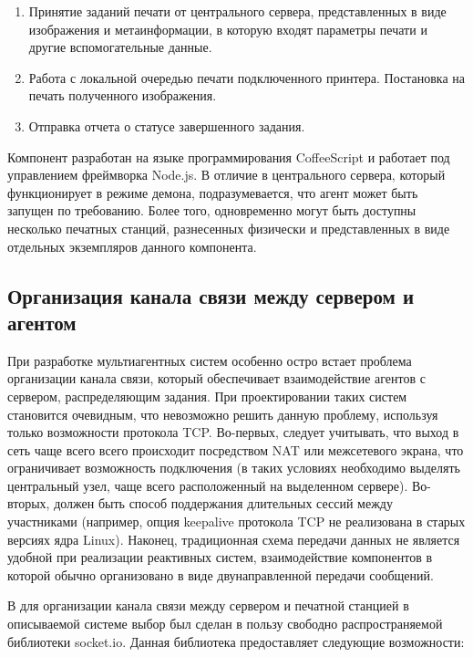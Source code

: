 \documentclass[a4paper,14pt,href]{article}
\begin{document}
\begin{enumerate}
  \item Принятие заданий печати от центрального сервера, представленных в виде изображения и метаинформации, в которую
  входят параметры печати и другие вспомогательные данные.

  \item Работа с локальной очередью печати подключенного принтера. Постановка на печать полученного изображения.

  \item Отправка отчета о статусе завершенного задания.
\end{enumerate}

Компонент разработан на языке программирования CoffeeScript и работает под управлением фреймворка Node.js. В отличие в
центрального сервера, который функционирует в режиме демона, подразумевается, что агент может быть запущен по требованию.
Более того, одновременно могут быть доступны несколько печатных станций, разнесенных физически и представленных в виде
отдельных экземпляров данного компонента.

\subsection{Организация канала связи между сервером и агентом}
При разработке мультиагентных систем особенно остро встает проблема организации канала связи, который обеспечивает
взаимодействие агентов с сервером, распределяющим задания. При проектировании таких систем становится очевидным, что
невозможно решить данную проблему, используя только возможности протокола TCP. Во-первых, следует учитывать, что
выход в сеть чаще всего всего происходит посредством NAT или межсетевого экрана, что ограничивает возможность
подключения (в таких условиях необходимо выделять центральный узел, чаще всего расположенный на выделенном сервере).
Во-вторых, должен быть способ поддержания длительных сессий между участниками (например, опция keepalive\cite{Keepalive}
протокола TCP не реализована в старых версиях ядра Linux). Наконец, традиционная схема передачи данных не является
удобной при реализации реактивных систем, взаимодействие компонентов в которой обычно организовано в виде двунаправленной
передачи сообщений.

В для организации канала связи между сервером и печатной станцией в описываемой системе выбор был сделан в пользу
свободно распространяемой библиотеки socket.io\cite{SocketIO}. Данная библиотека предоставляет следующие возможности:
\end{document}
